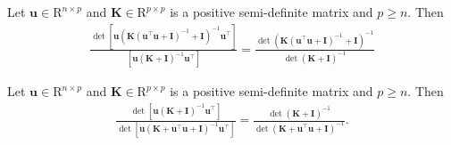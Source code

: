 \begin{auxlemma}
    \label{lemma:pinn-bo_det_division}
    Let $\mathbf{u} \in \mathrm{R}^{n \times p}$ and $\mathbf{K} \in \mathrm{R}^{p \times p}$ is a positive semi-definite matrix and $p \ge n$. Then 
    \begin{align*}
    \frac{\det [\mathbf{u}\left(\mathbf{K}(\mathbf{u}^\top\mathbf{u}+\mathbf{I})^{-1} + \mathbf{I}\right)^{-1}\mathbf{u}^\top]}{[\mathbf{u}\left(\mathbf{K} + \mathbf{I}\right)^{-1}\mathbf{u}^\top]} =  \frac{\det \left(\mathbf{K}(\mathbf{u}^\top\mathbf{u}+\mathbf{I})^{-1} + \mathbf{I}\right)^{-1}}{\det \left(\mathbf{K} + \mathbf{I}\right)^{-1}}   
    \end{align*}
\end{auxlemma}

\begin{subcorollary}
\label{corollary:pinn-bo_det_divison_corollary}
Let $\mathbf{u} \in \mathrm{R}^{n \times p}$ and $\mathbf{K} \in \mathrm{R}^{p \times p}$ is a positive semi-definite matrix and $p \ge n$. Then 
\begin{align*}
    \frac{\det[\mathbf{u}(\mathbf{K}+\mathbf{I})^{-1} \mathbf{u}^\top]}{\det [\mathbf{u}(\mathbf{K}+ \mathbf{u}^\top \mathbf{u} + \mathbf{I})^{-1} \mathbf{u}^\top]} = \frac{\det (\mathbf{K}+\mathbf{I})^{-1}}{\det(\mathbf{K}+\mathbf{u}^\top \mathbf{u}+\mathbf{I})^{-1}}.
\end{align*}
\end{subcorollary}

